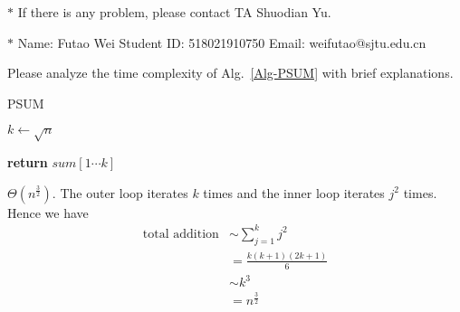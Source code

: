 \documentclass[12pt,a4paper]{article}
\makeatletter
\newtheorem*{solution}{Solution}
\theoremstyle{definition}
\renewenvironment{solution}[1][Solution] {\par\pushQED{\qed}\normalfont\topsep6\p@\@plus6\p@\relax\trivlist\item[\hskip\labelsep\bfseries#1\@addpunct{.}]\ignorespaces}{\popQED\endtrivlist\@endpefalse} \makeatother
\makeatother
\begin{document}
\noindent

\noindent{}
\begin{center}
\footnotesize{\color{red}$*$ If there is any problem, please contact TA Shuodian Yu.}

\footnotesize{\color{blue}$*$ Name: Futao Wei \quad Student ID: 518021910750 \quad Email: weifutao@sjtu.edu.cn}
\end{center}

\begin{enumerate}
    \item
    Please analyze the time complexity of Alg.~\ref{Alg-PSUM} with brief explanations.

    \begin{minipage}[t]{0.8\textwidth}
    \begin{algorithm}[H]
        \caption{PSUM}\label{Alg-PSUM}

        \BlankLine

        $k \leftarrow \sqrt{n}$\;


        {\bf return} $sum[1\cdots k]$\;
    \end{algorithm}
	\begin{solution}
		\hfill \break
		$\Theta(n^{\frac{3}{2}})$. The outer loop iterates $k$ times and the inner loop iterates $j^2$ times. Hence we have 
		\begin{align*}
			\text{total  addition} & \sim \sum_{j = 1}^{k} j^2 \\
			& = \frac{k(k + 1)(2k + 1)}{6} \\
			& \sim k^3 \\
			& = n^{\frac{3}{2}}
		\end{align*}
		
	\end{solution}
    \end{minipage}


\end{enumerate}
\end{document}
